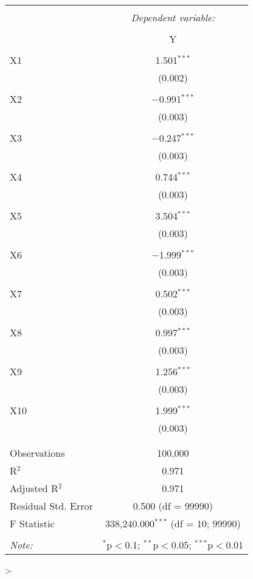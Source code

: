 \documentclass{article}
\begin{document}
\begin{table}[!htbp] \centering 
  \caption{} 
  \label{} 
\begin{tabular}{@{\extracolsep{5pt}}lc} 
\\[-1.8ex]\hline 
\hline \\[-1.8ex] 
 & \multicolumn{1}{c}{\textit{Dependent variable:}} \\ 
\cline{2-2} 
\\[-1.8ex] & Y \\ 
\hline \\[-1.8ex] 
 X1 & 1.501$^{***}$ \\ 
  & (0.002) \\ 
  & \\ 
 X2 & $-$0.991$^{***}$ \\ 
  & (0.003) \\ 
  & \\ 
 X3 & $-$0.247$^{***}$ \\ 
  & (0.003) \\ 
  & \\ 
 X4 & 0.744$^{***}$ \\ 
  & (0.003) \\ 
  & \\ 
 X5 & 3.504$^{***}$ \\ 
  & (0.003) \\ 
  & \\ 
 X6 & $-$1.999$^{***}$ \\ 
  & (0.003) \\ 
  & \\ 
 X7 & 0.502$^{***}$ \\ 
  & (0.003) \\ 
  & \\ 
 X8 & 0.997$^{***}$ \\ 
  & (0.003) \\ 
  & \\ 
 X9 & 1.256$^{***}$ \\ 
  & (0.003) \\ 
  & \\ 
 X10 & 1.999$^{***}$ \\ 
  & (0.003) \\ 
  & \\ 
\hline \\[-1.8ex] 
Observations & 100,000 \\ 
R$^{2}$ & 0.971 \\ 
Adjusted R$^{2}$ & 0.971 \\ 
Residual Std. Error & 0.500 (df = 99990) \\ 
F Statistic & 338,240.000$^{***}$ (df = 10; 99990) \\ 
\hline 
\hline \\[-1.8ex] 
\textit{Note:}  & \multicolumn{1}{r}{$^{*}$p$<$0.1; $^{**}$p$<$0.05; $^{***}$p$<$0.01} \\ 
\end{tabular} 
\end{table} 
> 
\end{document}
